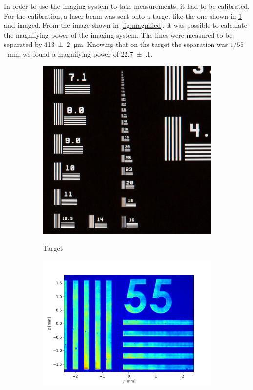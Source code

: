 In order to use the imaging system to take measurements, it had to be calibrated. For the calibration, a laser beam was sent onto a target like the one shown in \cref{fig:target} and imaged. From the image shown in \cref{fig:magnified}, it was possible to calculate the magnifying power of the imaging system. The lines were measured to be separated by \SI{413(2)}{\micro\meter}. Knowing that on the target the separation was $1/55$~mm, we found a magnifying power of \SI{22.7(1)}{}.

\begin{figure}
    \hfill
    \begin{subfigure}[b]{0.3 \textwidth}
        \includegraphics[width=\textwidth]{chapters/chapter_3/figures/target.jpg}
        \\
        \caption{Target}
        \label{fig:target}
    \end{subfigure}
    \hfill
    \begin{subfigure}[b]{0.55\textwidth}
        \includegraphics[width=\textwidth]{chapters/chapter_3/figures/magnified}

\end{subfigure}
\end{figure}
